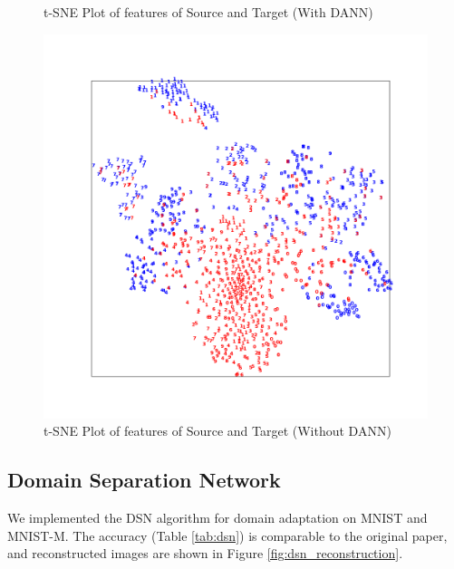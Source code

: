 \documentclass{article}
\begin{document}
\begin{figure}
\begin{minipage}{0.3\textwidth}
    \caption{t-SNE Plot of features of Source and Target (With DANN)}
    \label{fig:dann_mnist_tar}
  \end{minipage}
  \hfill
  \begin{minipage}{0.3\textwidth}
    \centering
    \includegraphics[width=\textwidth]{DANN/Source-only.png}
    \caption{t-SNE Plot of features of Source and Target (Without DANN)}
    \label{fig:dann_mnist_source}
  \end{minipage}
  

\end{figure}

\subsection{Domain Separation Network}
We implemented the DSN\cite{DSN} algorithm for domain adaptation on MNIST and MNIST-M. The accuracy (Table \ref{tab:dsn}) is comparable to the original paper, and reconstructed images are shown in Figure \ref{fig:dsn_reconstruction}.
\end{document}
